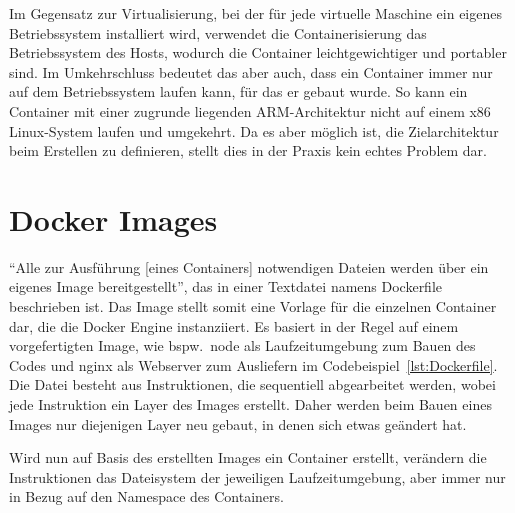 Im Gegensatz zur Virtualisierung, bei der für jede virtuelle Maschine ein eigenes Betriebssystem installiert wird, verwendet die Containerisierung das Betriebssystem des Hosts, wodurch die Container leichtgewichtiger und portabler sind. 
Im Umkehrschluss bedeutet das aber auch, dass ein Container immer nur auf dem Betriebssystem laufen kann, für das er gebaut wurde. 
So kann ein Container mit einer zugrunde liegenden ARM-Architektur nicht auf einem x86 Linux-System laufen und umgekehrt. 
Da es aber möglich ist, die Zielarchitektur beim Erstellen zu definieren, stellt dies in der Praxis kein echtes Problem dar.

\section{Docker Images}

``Alle zur Ausführung [eines Containers] notwendigen Dateien werden über ein eigenes Image bereitgestellt''\cite{red_hat_was_2023}, das in einer Textdatei namens Dockerfile beschrieben ist. 
Das Image stellt somit eine Vorlage für die einzelnen Container dar, die die Docker Engine instanziiert. 
Es basiert in der Regel auf einem vorgefertigten Image, wie bspw.\ node als Laufzeitumgebung zum Bauen des Codes und nginx als Webserver zum Ausliefern im Codebeispiel~\ref{lst:Dockerfile}.
Die Datei besteht aus Instruktionen, die sequentiell abgearbeitet werden, wobei jede Instruktion ein Layer des Images erstellt.
Daher werden beim Bauen eines Images nur diejenigen Layer neu gebaut, in denen sich etwas ge\"andert hat.



Wird nun auf Basis des erstellten Images ein Container erstellt, verändern die Instruktionen das Dateisystem der jeweiligen Laufzeitumgebung, aber immer nur in Bezug auf den Namespace des Containers. 
